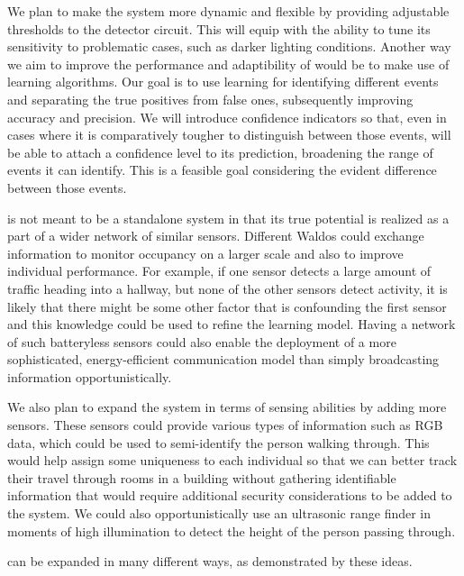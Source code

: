  We plan to make the system more dynamic and flexible by providing adjustable thresholds to the detector circuit.
This will equip \sysname with the ability to tune its sensitivity to problematic cases, such as darker lighting conditions.
Another way we aim to improve the performance and adaptibility of \sysname would be to make use of learning algorithms.
Our goal is to use learning for identifying different events and separating the true positives from false ones, subsequently improving accuracy and precision.
We will introduce confidence indicators so that, even in cases where it is comparatively tougher to distinguish between those events, \sysname will be able to attach a confidence level to its prediction, broadening the range of events it can identify.
This is a feasible goal considering the evident difference between those events.

\sysname is not meant to be a standalone system in that its true potential is realized as a part of a wider network of similar sensors.
Different Waldos could exchange information to monitor occupancy on a larger scale and also to improve individual performance.
For example, if one sensor detects a large amount of traffic heading into a hallway, but none of the other sensors detect activity, it is likely that there might be some other factor that is confounding the first sensor and this knowledge could be used to refine the learning model.
Having a network of such batteryless sensors could also enable the deployment of a more sophisticated, energy-efficient communication model than simply broadcasting information opportunistically.

 We also plan to expand the system in terms of sensing abilities by adding more sensors.
These sensors could provide various types of information such as RGB data, which could be used to semi-identify the person walking through.
This would help assign some uniqueness to each individual so that we can better track their travel through rooms in a building without gathering identifiable information that would require additional security considerations to be added to the system.
We could also opportunistically use an ultrasonic range finder in moments of high illumination to detect the height of the person passing through.

\sysname can be expanded in many different ways, as demonstrated by these ideas.



